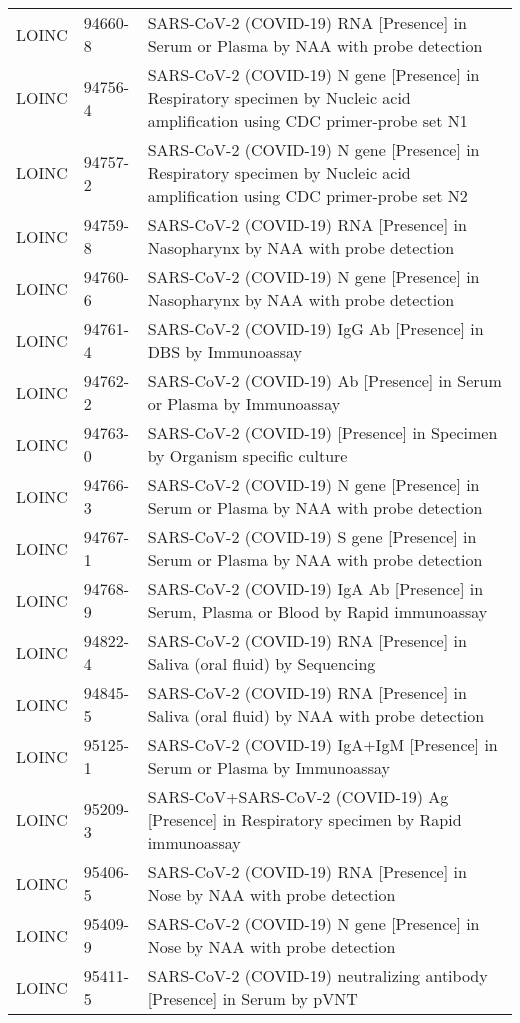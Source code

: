 \begin{table}[ht]
\begin{tabular}{lll}
  LOINC & 94660-8 & SARS-CoV-2 (COVID-19) RNA [Presence] in Serum or Plasma by NAA with probe detection \\ 
  LOINC & 94756-4 & SARS-CoV-2 (COVID-19) N gene [Presence] in Respiratory specimen by Nucleic acid amplification using CDC primer-probe set N1 \\ 
  LOINC & 94757-2 & SARS-CoV-2 (COVID-19) N gene [Presence] in Respiratory specimen by Nucleic acid amplification using CDC primer-probe set N2 \\ 
  LOINC & 94759-8 & SARS-CoV-2 (COVID-19) RNA [Presence] in Nasopharynx by NAA with probe detection \\ 
  LOINC & 94760-6 & SARS-CoV-2 (COVID-19) N gene [Presence] in Nasopharynx by NAA with probe detection \\ 
  LOINC & 94761-4 & SARS-CoV-2 (COVID-19) IgG Ab [Presence] in DBS by Immunoassay \\ 
  LOINC & 94762-2 & SARS-CoV-2 (COVID-19) Ab [Presence] in Serum or Plasma by Immunoassay \\ 
  LOINC & 94763-0 & SARS-CoV-2 (COVID-19) [Presence] in Specimen by Organism specific culture \\ 
  LOINC & 94766-3 & SARS-CoV-2 (COVID-19) N gene [Presence] in Serum or Plasma by NAA with probe detection \\ 
  LOINC & 94767-1 & SARS-CoV-2 (COVID-19) S gene [Presence] in Serum or Plasma by NAA with probe detection \\ 
  LOINC & 94768-9 & SARS-CoV-2 (COVID-19) IgA Ab [Presence] in Serum, Plasma or Blood by Rapid immunoassay \\ 
  LOINC & 94822-4 & SARS-CoV-2 (COVID-19) RNA [Presence] in Saliva (oral fluid) by Sequencing \\ 
  LOINC & 94845-5 & SARS-CoV-2 (COVID-19) RNA [Presence] in Saliva (oral fluid) by NAA with probe detection \\ 
  LOINC & 95125-1 & SARS-CoV-2 (COVID-19) IgA+IgM [Presence] in Serum or Plasma by Immunoassay \\ 
  LOINC & 95209-3 & SARS-CoV+SARS-CoV-2 (COVID-19) Ag [Presence] in Respiratory specimen by Rapid immunoassay \\ 
  LOINC & 95406-5 & SARS-CoV-2 (COVID-19) RNA [Presence] in Nose by NAA with probe detection \\ 
  LOINC & 95409-9 & SARS-CoV-2 (COVID-19) N gene [Presence] in Nose by NAA with probe detection \\ 
  LOINC & 95411-5 & SARS-CoV-2 (COVID-19) neutralizing antibody [Presence] in Serum by pVNT \\ 

\end{tabular}
\end{table}
